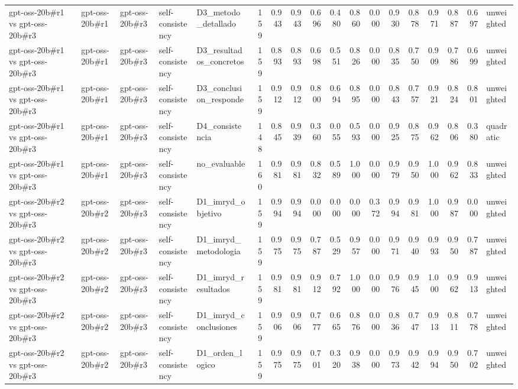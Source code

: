 \begin{table}
{\begin{tabular}{lllllrrrrrrrrrrrrl}
gpt-oss-20b\#r1 vs gpt-oss-20b\#r3 & gpt-oss-20b\#r1 & gpt-oss-20b\#r3 & self-consistency & D3\_metodo\_detallado & 159 & 0.943 & 0.943 & 0.696 & 0.480 & 0.860 & 0.000 & 0.930 & 0.878 & 0.971 & 0.887 & 0.697 & unweighted \\
gpt-oss-20b\#r1 vs gpt-oss-20b\#r3 & gpt-oss-20b\#r1 & gpt-oss-20b\#r3 & self-consistency & D3\_resultados\_concretos & 159 & 0.893 & 0.893 & 0.698 & 0.551 & 0.826 & 0.000 & 0.835 & 0.750 & 0.909 & 0.786 & 0.699 & unweighted \\
gpt-oss-20b\#r1 vs gpt-oss-20b\#r3 & gpt-oss-20b\#r1 & gpt-oss-20b\#r3 & self-consistency & D3\_conclusion\_responde & 159 & 0.912 & 0.912 & 0.800 & 0.694 & 0.895 & 0.000 & 0.843 & 0.757 & 0.921 & 0.824 & 0.801 & unweighted \\
gpt-oss-20b\#r1 vs gpt-oss-20b\#r3 & gpt-oss-20b\#r1 & gpt-oss-20b\#r3 & self-consistency & D4\_consistencia & 148 & 0.845 & 0.939 & 0.360 & 0.055 & 0.593 & 0.000 & 0.925 & 0.875 & 0.962 & 0.806 & 0.380 & quadratic \\
gpt-oss-20b\#r1 vs gpt-oss-20b\#r3 & gpt-oss-20b\#r1 & gpt-oss-20b\#r3 & self-consistency & no\_evaluable & 160 & 0.981 & 0.981 & 0.832 & 0.589 & 1.000 & 0.000 & 0.979 & 0.950 & 1.000 & 0.962 & 0.833 & unweighted \\
gpt-oss-20b\#r2 vs gpt-oss-20b\#r3 & gpt-oss-20b\#r2 & gpt-oss-20b\#r3 & self-consistency & D1\_imryd\_objetivo & 159 & 0.994 & 0.994 & 0.000 & 0.000 & 0.000 & 0.372 & 0.994 & 0.981 & 1.000 & 0.987 & 0.000 & unweighted \\
gpt-oss-20b\#r2 vs gpt-oss-20b\#r3 & gpt-oss-20b\#r2 & gpt-oss-20b\#r3 & self-consistency & D1\_imryd\_metodologia & 159 & 0.975 & 0.975 & 0.787 & 0.529 & 0.957 & 0.000 & 0.971 & 0.940 & 0.993 & 0.950 & 0.787 & unweighted \\
gpt-oss-20b\#r2 vs gpt-oss-20b\#r3 & gpt-oss-20b\#r2 & gpt-oss-20b\#r3 & self-consistency & D1\_imryd\_resultados & 159 & 0.981 & 0.981 & 0.912 & 0.792 & 1.000 & 0.000 & 0.976 & 0.945 & 1.000 & 0.962 & 0.913 & unweighted \\
gpt-oss-20b\#r2 vs gpt-oss-20b\#r3 & gpt-oss-20b\#r2 & gpt-oss-20b\#r3 & self-consistency & D1\_imryd\_conclusiones & 159 & 0.906 & 0.906 & 0.777 & 0.665 & 0.876 & 0.000 & 0.836 & 0.747 & 0.913 & 0.811 & 0.778 & unweighted \\
gpt-oss-20b\#r2 vs gpt-oss-20b\#r3 & gpt-oss-20b\#r2 & gpt-oss-20b\#r3 & self-consistency & D1\_orden\_logico & 159 & 0.975 & 0.975 & 0.701 & 0.320 & 0.938 & 0.000 & 0.973 & 0.942 & 0.994 & 0.950 & 0.702 & unweighted \\

\end{tabular}}
\end{table}

